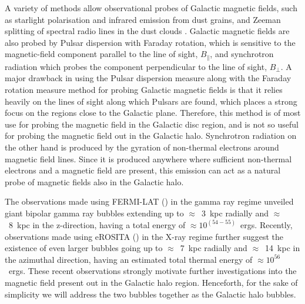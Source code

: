 \documentclass[usenatbib]{mnras}
\begin{document}
A variety of methods allow observational probes of Galactic magnetic fields, such as starlight polarisation and infrared emission from dust grains, and Zeeman splitting of spectral radio lines in the dust clouds \citep{Beck_2007}. Galactic magnetic fields are also probed by Pulsar dispersion with Faraday rotation, which is sensitive to the magnetic-field component parallel to the line of sight, $B_{\parallel}$, and synchrotron radiation which probes the component perpendicular to the line of sight, $B_{\perp}$. A major drawback in using the Pulsar dispersion measure along with the Faraday rotation measure method for probing Galactic magnetic fields is that it relies heavily on the lines of sight along which Pulsars are found, which places a strong focus on the regions close to the Galactic plane. Therefore, this method is of most use for probing the magnetic field in the Galactic disc region, and is not so useful for probing the magnetic field out in the Galactic halo. Synchrotron radiation on the other hand is produced by the gyration of non-thermal electrons around magnetic field lines. Since it is produced anywhere where sufficient non-thermal electrons and a magnetic field are present, this emission can act as a natural probe of magnetic fields also in the Galactic halo.

The observations made using FERMI-LAT (\cite{Dobler_2010, Su_2010, Su_2012}) in the gamma ray regime unveiled giant bipolar gamma ray bubbles extending up to $\approx$~3~kpc radially and $\approx$~8~kpc in the z-direction, having a total energy of $\approx 10^{(54-55)}$~ergs. Recently, observations made using eROSITA (\cite{eROSITA}) in the X-ray regime further suggest the existence of even larger bubbles going up to  $\approx$~7~kpc radially and $\approx$~14~kpc in the azimuthal direction, having an estimated total thermal energy of $\approx 10^{56}$~ergs. These recent observations strongly motivate further investigations into the magnetic field present out in the Galactic halo region. Henceforth, for the sake of simplicity we will address the two bubbles together as the Galactic halo bubbles.
\end{document}
